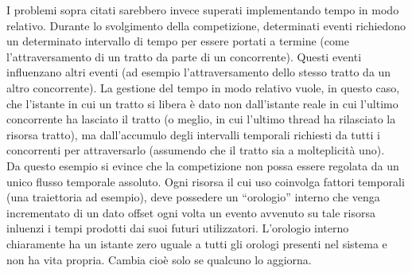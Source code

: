 I problemi sopra citati sarebbero invece superati implementando tempo in modo relativo. Durante lo svolgimento della competizione, determinati eventi richiedono un determinato
intervallo di tempo per essere portati a termine (come l'attraversamento di un tratto da parte di un concorrente). Questi eventi influenzano altri eventi (ad esempio
l'attraversamento dello stesso tratto da un altro concorrente). 
La gestione del tempo in modo relativo vuole, in questo caso, che l'istante in cui un tratto si libera è dato
non dall'istante reale in cui l'ultimo concorrente ha lasciato il tratto (o meglio, in cui l'ultimo thread ha rilasciato
la risorsa tratto), ma dall'accumulo degli intervalli temporali richiesti da tutti i concorrenti per attraversarlo (assumendo che il tratto
sia a molteplicità uno).\\
Da questo esempio si evince che la competizione non possa essere regolata da un unico flusso temporale assoluto. Ogni risorsa il cui uso
coinvolga fattori temporali (una traiettoria ad esempio), deve
possedere un ``orologio'' interno che venga incrementato di un dato offset ogni volta un evento avvenuto su tale risorsa inluenzi i tempi
prodotti dai suoi futuri utilizzatori. L'orologio interno chiaramente ha un istante zero uguale a tutti gli orologi presenti nel sistema
e non ha vita propria. Cambia cioè solo se qualcuno lo aggiorna.\\
